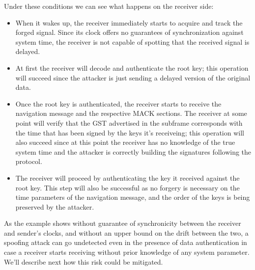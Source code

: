 
Under these conditions we can see what happens on the receiver side:
\begin{itemize}
  \item When it wakes up, the receiver immediately starts to acquire and track
    the forged signal. Since its clock offers no guarantees of synchronization
    against system time, the receiver is not capable of spotting that the
    received signal is delayed.
  \item At first the receiver will decode and authenticate the root key; this
    operation will succeed since the attacker is just sending a delayed version
    of the original data.
  \item Once the root key is authenticated, the receiver starts to receive the
    navigation message and the respective MACK sections. The receiver at some
    point will verify that the GST advertised in the subframe corresponds with
    the time that has been signed by the keys it's receiveing; this operation
    will also succeed since at this point the receiver has no knowledge of the
    true system time and the attacker is correctly building the signatures
    following the protocol.
  \item The receiver will proceed by authenticating the key it received against
    the root key. This step will also be successful as no forgery is necessary
    on the time parameters of the navigation message, and the order of the keys
    is being preserved by the attacker.
\end{itemize}

As the example shows without guarantee of synchronicity between the receiver
and sender's clocks, and without an upper bound on the drift between the two, a
spoofing attack can go undetected even in the presence of data authentication in
case a receiver starts receiving without prior knowledge of any system
parameter. We'll describe next how this risk could be mitigated.

